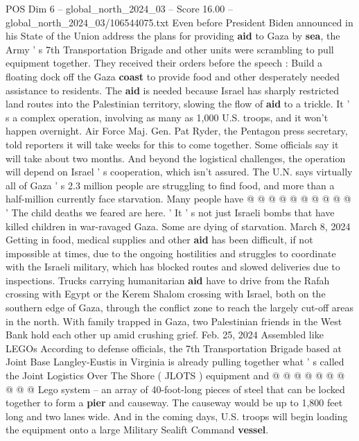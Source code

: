 \begin{textsample}{POS Dim 6 – global\_north\_2024\_03 – Score 16.00 – global\_north\_2024\_03/106544075.txt}  \label{ex:f6_pos_042}
Even before President Biden announced in his State of the Union address the plans for providing \textbf{aid} to Gaza by \textbf{sea}, the Army ' s 7th Transportation Brigade and other units were scrambling to pull equipment together.
They received their orders before the speech : Build a floating dock off the Gaza \textbf{coast} to provide food and other desperately needed assistance to residents.
The \textbf{aid} is needed because Israel has sharply restricted land routes into the Palestinian territory, slowing the flow of \textbf{aid} to a trickle.
It ' s a complex operation, involving as many as 1,000 U.S. troops, and it won't happen overnight.
Air Force Maj.
Gen.
Pat Ryder, the Pentagon press secretary, told reporters it will take weeks for this to come together.
Some officials say it will take about two months.
And beyond the logistical challenges, the operation will depend on Israel ' s cooperation, which isn't assured.
The U.N. says virtually all of Gaza ' s 2.3 million people are struggling to find food, and more than a half-million currently face starvation.
Many people have @ @ @ @ @ @ @ @ @ @ ' The child deaths we feared are here. ' It ' s not just Israeli bombs that have killed children in war-ravaged Gaza.
Some are dying of starvation.
March 8, 2024 Getting in food, medical supplies and other \textbf{aid} has been difficult, if not impossible at times, due to the ongoing hostilities and struggles to coordinate with the Israeli military, which has blocked routes and slowed deliveries due to inspections.
Trucks carrying humanitarian \textbf{aid} have to drive from the Rafah crossing with Egypt or the Kerem Shalom crossing with Israel, both on the southern edge of Gaza, through the conflict zone to reach the largely cut-off areas in the north.
With family trapped in Gaza, two Palestinian friends in the West Bank hold each other up amid crushing grief.
Feb. 25, 2024 Assembled like LEGOs According to defense officials, the 7th Transportation Brigade based at Joint Base Langley-Eustis in Virginia is already pulling together what ' s called the Joint Logistics Over The Shore ( JLOTS ) equipment and @ @ @ @ @ @ @ @ @ @ Lego system -- an array of 40-foot-long pieces of steel that can be locked together to form a \textbf{pier} and causeway.
The causeway would be up to 1,800 feet long and two lanes wide.
And in the coming days, U.S. troops will begin loading the equipment onto a large Military Sealift Command \textbf{vessel}.

\end{textsample}
